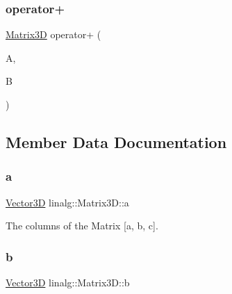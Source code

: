 \subsubsection{\texorpdfstring{operator+}{operator+}}
{\footnotesize\ttfamily \mbox{\hyperlink{classlinalg_1_1Matrix3D}{Matrix3D}} operator+ (\begin{DoxyParamCaption}\item[{\mbox{\hyperlink{classlinalg_1_1Matrix3D}{Matrix3D}}}]{A,  }\item[{const \mbox{\hyperlink{classlinalg_1_1Matrix3D}{Matrix3D}} \&}]{B }\end{DoxyParamCaption})\hspace{0.3cm}{\ttfamily [friend]}}



\subsection{Member Data Documentation}
\mbox{\label{classlinalg_1_1Matrix3D_a33667283fe3c4bbac6d4f78eae2af3b6}} 
\subsubsection{\texorpdfstring{a}{a}}
{\footnotesize\ttfamily \mbox{\hyperlink{classVector3D}{Vector3D}} linalg\+::\+Matrix3\+D\+::a\hspace{0.3cm}{\ttfamily [private]}}



The columns of the Matrix \mbox{[}a, b, c\mbox{]}. 

\mbox{\label{classlinalg_1_1Matrix3D_acf0cd214420329fe18c902be95da0b23}} 
\subsubsection{\texorpdfstring{b}{b}}
{\footnotesize\ttfamily \mbox{\hyperlink{classVector3D}{Vector3D}} linalg\+::\+Matrix3\+D\+::b\hspace{0.3cm}{\ttfamily [private]}}

\mbox{\label{classlinalg_1_1Matrix3D_abe82e945bf73f0d0f6f28c1749e2c7e3}} 
